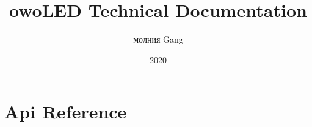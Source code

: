 \documentclass[12pt]{article}
\title{owoLED Technical Documentation}
\date{2020}
\author{молния Gang}
\begin{document}

\tableofcontents
\newpage


\newpage


\newpage


\newpage


\newpage
\section{Api Reference}

\end{document}
